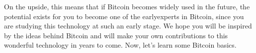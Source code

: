 \par On the upside, this means that if Bitcoin becomes widely used in the future, the potential exists for you to become one of the earlyexperts in Bitcoin, since you are studying this technology at such an early stage. We hope you will be inspired by the ideas behind Bitcoin and will make your own contributions to this wonderful technology in years to come. Now, let’s learn some Bitcoin basics.


